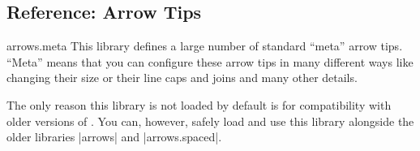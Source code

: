 \subsection{Reference: Arrow Tips}
\label{section-arrows-meta}

\begin{pgflibrary}{arrows.meta}
    This library defines a large number of standard ``meta'' arrow tips.
    ``Meta'' means that you can configure these arrow tips in many different
    ways like changing their size or their line caps and joins and many other
    details.

    The only reason this library is not loaded by default is for compatibility
    with older versions of \tikzname. You can, however, safely load and use
    this library alongside the older libraries |arrows| and |arrows.spaced|.
\end{pgflibrary}


